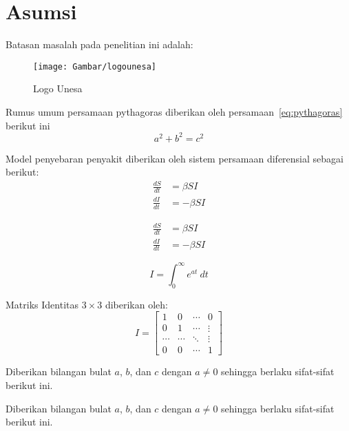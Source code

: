 \section{Asumsi}
Batasan masalah pada penelitian ini adalah:

\begin{figure}[h!]
	\centering
	\texttt{[image: Gambar/logounesa]}
	\caption{Logo Unesa}
	\label{fig:logounesa}
\end{figure}

Rumus umum persamaan pythagoras diberikan oleh persamaan~\ref{eq:pythagoras} berikut ini
\begin{equation}
	a^2 + b^2 = c^2 \label{eq:pythagoras}
\end{equation}

Model penyebaran penyakit diberikan oleh sistem persamaan diferensial sebagai berikut:
\begin{align}
	\frac{dS}{dt} &= \beta S I\\
	\nonumber \frac{dI}{dt} &= -\beta S I
\end{align}

\begin{equation}
	\begin{aligned}
		\frac{dS}{dt} &= \beta S I\\
		\frac{dI}{dt} &= -\beta S I
	\end{aligned}
\end{equation}

\begin{equation}
	I = \int_0^{\infty} e^{at}~{dt}
\end{equation}

Matriks Identitas $3 \times 3$ diberikan oleh:
\begin{equation}
	I = \begin{bmatrix}
	1 & 0 & \cdots & 0\\
	0 & 1 & \cdots & \vdots\\
	\cdots & \cdots & \ddots &\vdots\\
	0 & 0 & \cdots & 1
	\end{bmatrix}
\end{equation}

\begin{theorem}
	Diberikan bilangan bulat  $a$, $b$, dan $c$ dengan $a \neq 0$ sehingga berlaku sifat-sifat berikut ini.
\end{theorem}

\begin{theorem}
	Diberikan bilangan bulat  $a$, $b$, dan $c$ dengan $a \neq 0$ sehingga berlaku sifat-sifat berikut ini.
\end{theorem}

